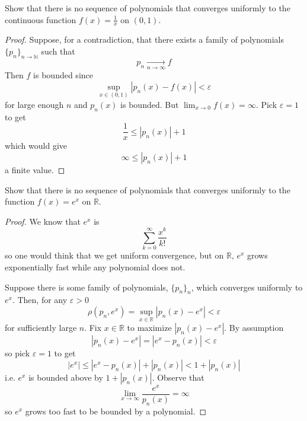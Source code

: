 \begin{prob}
    Show that there is no sequence of polynomials that converges 
    uniformly to the continuous function $f(x) = \frac{1}{x}$ 
    on $(0,1)$.
\end{prob}
\begin{proof}
    Suppose, for a contradiction, that there exists a family of 
    polynomials $\{p_n\}_{n\to\mathbb N}$ 
    such that 
    \[
        p_n \underset{n \to \infty}{\to} f
    \]
    Then $f$ is bounded since 
    \[
        \sup_{x \in (0,1)}|p_n(x) - f(x)| < \varepsilon
    \]
    for large enough $n$ and $p_n(x)$ is bounded. 
    But $\lim_{x\to0}f(x) = \infty$. 
    Pick $\varepsilon = 1$ to get 
    \[
        \frac{1}{x} \leq |p_n(x)| + 1
    \]
    which would give 
    \[
        \infty \leq |p_n(x)| + 1
    \]
    a finite value.
\end{proof}
\begin{prob}
    Show that there is no sequence of polynomials that converges 
    uniformly to the function $f(x) = e^x$ on $\mathbb R$. 
\end{prob}
\begin{proof}
    We know that $e^x$ is 
    \[
        \displaystyle\sum_{k=0}^\infty \frac{x^k}{k!}
    \]
    so one would think that we get uniform convergence, but 
    on $\mathbb R$, $e^x$ grows exponentially fast while 
    any polynomial does not. 

    Suppose there is some family of polynomials, 
    $\{p_n\}_n$, which converges uniformly to $e^x$. 
    Then, for any $\varepsilon > 0$ 
    \[
        \rho(p_n,e^x) = \sup_{x\in\mathbb R}|p_n(x) - e^x| <  
        \varepsilon
    \]
    for sufficiently large $n$. 
    Fix $x \in \mathbb R$ to maximize $|p_n(x) - e^x|$. By assumption 
    \[
        |p_n(x)-e^x| = |e^x - p_n(x)| < \varepsilon
    \]
    so pick $\varepsilon = 1$ to get  
    \[
        |e^x| \leq |e^x - p_n(x)| + |p_n(x)| < 1 + |p_n(x)|
    \]
    i.e. $e^x$ is bounded above by $1 + |p_n(x)|$. 
    Observe that 
    \[
        \lim_{x\to\infty}\frac{e^x}{p_n(x)} = \infty
    \]
    so $e^x$ grows too fast to be bounded by a polynomial.
\end{proof}


